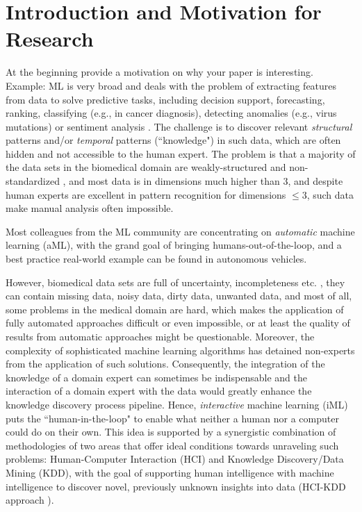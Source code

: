 \documentclass{llncs}
\begin{document}
\renewcommand{\thesubfigure}{\thefigure.\arabic{subfigure}}
\makeatletter
\renewcommand{\p@subfigure}{}
\renewcommand{\@thesubfigure}{\thesubfigure:\hskip\subfiglabelskip}
\makeatother

\section{Introduction and Motivation for Research}

At the beginning provide a motivation on why your paper is interesting. Example:
ML is very broad and deals with the problem of extracting features from data to solve predictive tasks, including decision support, forecasting, ranking, classifying (e.g., in cancer diagnosis), detecting anomalies (e.g., virus mutations) or sentiment analysis \cite{PetzEtAl:2015:Sentiment}. The challenge is to discover relevant \emph{structural} patterns and/or \emph{temporal} patterns (``knowledge") in such data, which are often hidden and not accessible to the human expert. The problem is that a majority of the data sets in the biomedical domain are weakly-structured and non-standardized \cite{HolzingerEtAl:2014:KDDBio}, and most data is in dimensions much higher than $3$, and despite human experts are excellent in pattern recognition for dimensions $\leq 3$, such data make manual analysis often impossible.

Most colleagues from the ML community are concentrating on \textit{automatic} machine learning (aML), with the grand goal of bringing humans-out-of-the-loop, and a best practice real-world example can be found in autonomous vehicles.

However, biomedical data sets are full of uncertainty, incompleteness etc. \cite{Holzinger:2014:SpringerTextbook}, they can contain missing data, noisy data, dirty data, unwanted data, and most of all, some problems in the medical domain are hard, which makes the application of fully automated approaches difficult or even impossible, or at least the quality of results from automatic approaches might be questionable. Moreover, the complexity of sophisticated machine learning algorithms has detained non-experts from the application of such solutions.
Consequently, the integration of the knowledge of a domain expert can sometimes be indispensable and the interaction of a domain expert with the data would greatly enhance the knowledge discovery process pipeline.
Hence, \textit{interactive} machine learning (iML) puts the ``human-in-the-loop" to enable what neither a human nor a computer could do on their own. This idea is supported by a synergistic combination of methodologies of two areas that offer ideal conditions towards unraveling such problems: Human-Computer Interaction (HCI) and Knowledge Discovery/Data Mining (KDD), with the goal of supporting human intelligence with machine intelligence to discover novel, previously unknown insights into data (HCI-KDD approach \cite{Holzinger:2013:HCI-KDD}).
\end{document}
